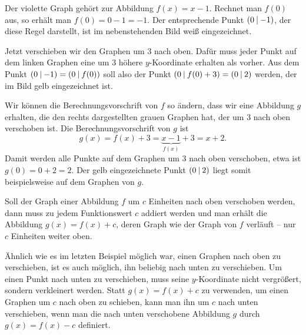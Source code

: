\documentclass[../../main.tex]{subfiles}
\begin{document}
\begin{example}
    Der violette Graph gehört zur Abbildung \mbox{$f(x)=x-1$}. Rechnet man $f(0)$ aus, so erhält man \mbox{$f(0)=0-1=-1$}. Der entsprechende Punkt $\left(0 \:\middle|\: -1\right)$, der diese Regel darstellt, ist im nebenstehenden Bild weiß eingezeichnet.
    
    Jetzt verschieben wir den Graphen um $3$ nach oben. Dafür muss jeder Punkt auf dem linken Graphen eine um $3$ höhere $y$-Koordinate erhalten als vorher. Aus dem Punkt $\left(0 \:\middle|\: -1\right)=\left(0 \:\middle|\: f(0)\right)$ soll also der Punkt $\left(0 \:\middle|\: f(0)+3\right)=\left(0 \:\middle|\: 2\right)$ werden, der im Bild gelb eingezeichnet ist.
    
    Wir können die Berechnungsvorschrift von $f$ so ändern, dass wir eine Abbildung $g$ erhalten, die den rechts dargestellten grauen Graphen hat, der um $3$ nach oben verschoben ist. Die Berechnungsvorschrift von $g$ ist \[g(x)=f(x)+3=\underbrace{x-1}_{f(x)}+3=x+2.\] 
    Damit werden alle Punkte auf dem Graphen um $3$ nach oben verschoben, etwa ist $g(0)=0+2=2$. Der gelb eingezeichnete Punkt $\left(0 \:\middle|\: 2\right)$ liegt somit beispielsweise auf dem Graphen von $g$.
\end{example}

\sloppy
Soll der Graph einer Abbildung $f$ um $c$ Einheiten nach oben verschoben werden, dann muss zu jedem Funktionswert $c$ addiert werden und man erhält die Abbildung \mbox{$g(x)=f(x)+c$}, deren Graph wie der Graph von $f$ verläuft -- nur $c$ Einheiten weiter oben.

\fussy
Ähnlich wie es im letzten Beispiel möglich war, einen Graphen nach oben zu verschieben, ist es auch möglich, ihn beliebig nach unten zu verschieben. Um einen Punkt nach unten zu verschieben, muss seine $y$-Koordinate nicht vergrößert, sondern verkleinert werden. Statt $g(x)=f(x)+c$ zu verwenden, um einen Graphen um $c$ nach oben zu schieben, kann man ihn um $c$ nach unten verschieben, wenn man die nach unten verschobene Abbildung $g$ durch $g(x)=f(x)-c$ definiert.
\end{document}
